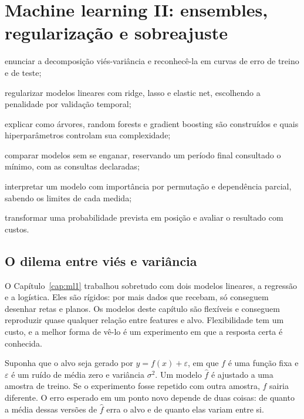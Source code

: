 \chapter{Machine learning II: ensembles, regularização e sobreajuste}
\label{cap:ml2}


\begin{objetivos}
  \item enunciar a decomposição viés-variância e reconhecê-la em curvas de erro de treino e de teste;
  \item regularizar modelos lineares com ridge, lasso e elastic net, escolhendo a penalidade por validação temporal;
  \item explicar como árvores, random forests e gradient boosting são construídos e quais hiperparâmetros controlam sua complexidade;
  \item comparar modelos sem se enganar, reservando um período final consultado o mínimo, com as consultas declaradas;
  \item interpretar um modelo com importância por permutação e dependência parcial, sabendo os limites de cada medida;
  \item transformar uma probabilidade prevista em posição e avaliar o resultado com custos.
\end{objetivos}

\section{O dilema entre viés e variância}
\label{sec:c13-vies}

O Capítulo~\ref{cap:ml1} trabalhou sobretudo com dois modelos lineares, a regressão e a logística. Eles são rígidos: por mais dados que recebam, só conseguem desenhar retas e planos. Os modelos deste capítulo são flexíveis e conseguem reproduzir quase qualquer relação entre features e alvo. Flexibilidade tem um custo, e a melhor forma de vê-lo é um experimento em que a resposta certa é conhecida.

Suponha que o alvo seja gerado por $y = f(x) + \varepsilon$, em que $f$ é uma função fixa e $\varepsilon$ é um ruído de média zero e variância $\sigma^2$. Um modelo $\hat f$ é ajustado a uma amostra de treino. Se o experimento fosse repetido com outra amostra, $\hat f$ sairia diferente. O erro esperado em um ponto novo depende de duas coisas: de quanto a média dessas versões de $\hat f$ erra o alvo e de quanto elas variam entre si.

